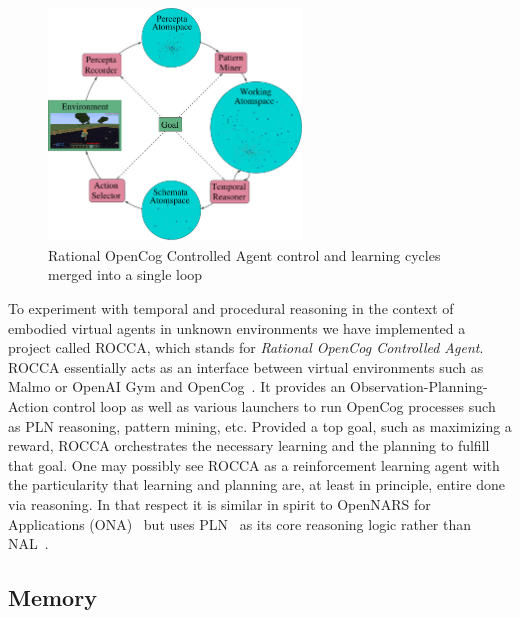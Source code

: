 \documentclass[runningheads]{llncs}
\begin{document}
\begin{figure}
  \centerline{\includegraphics[width=0.6\textwidth]{pictures/rocca-chart-v0.7.pdf}}
  \caption{Rational OpenCog Controlled Agent control and learning
    cycles merged into a single loop}
  \label{fig:rocca}
\end{figure}

To experiment with temporal and procedural reasoning in the context of
embodied virtual agents in unknown environments we have implemented a
project called ROCCA, which stands for \emph{Rational OpenCog
  Controlled Agent}.  ROCCA essentially acts as an interface between
virtual environments such as Malmo \cite{Johnson2016} or OpenAI Gym
\cite{Brockman2016} and OpenCog~\cite{Hart2008}.  It provides an
Observation-Planning-Action control loop as well as various launchers
to run OpenCog processes such as PLN reasoning, pattern mining, etc.
Provided a top goal, such as maximizing a reward, ROCCA orchestrates
the necessary learning and the planning to fulfill that goal.
One may possibly see ROCCA as a reinforcement learning agent with the
particularity that learning and planning are, at least in principle,
entire done via reasoning.  In that respect it is similar in spirit to
OpenNARS for Applications (ONA)~\cite{Hammer2020} but uses
PLN~\cite{Goertzel2009} as its core
reasoning logic rather than NAL~\cite{Wang2011}.\\

\subsection{Memory}
\end{document}
